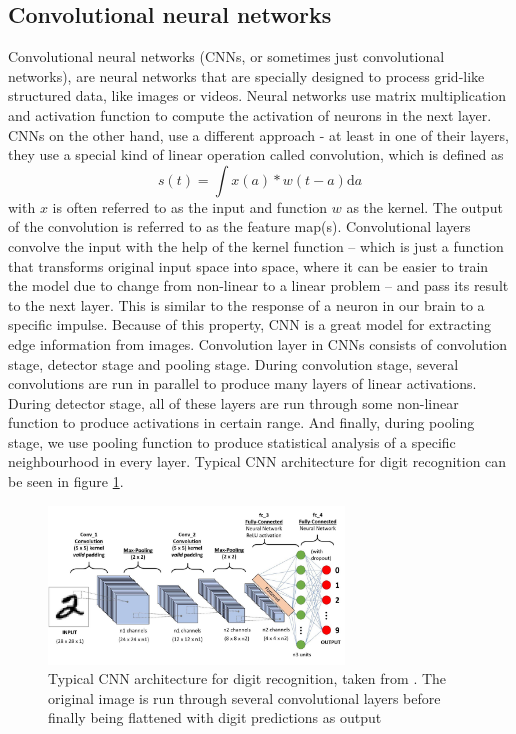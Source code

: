     \subsection{Convolutional neural networks}
    Convolutional neural networks (CNNs, or sometimes just convolutional networks), are neural networks that are specially designed to process grid-like structured data, like images or videos.
    \newline
    Neural networks use matrix multiplication and activation function to compute the activation of neurons in the next layer. CNNs on the other hand, use a different approach - at least in one of their layers, they use a special kind of linear operation called convolution, which is defined as 
    $$ s(t) = \int x(a) * w(t - a) \mathrm{d}a $$
    with $x$ is often referred to as the input and function $w$ as the kernel. The output of the convolution is referred to as the feature map(s). Convolutional layers convolve the input with the help of the kernel function -- which is just a function that transforms original input space into space, where it can be easier to train the model due to change from non-linear to a linear problem -- and pass its result to the next layer. This is similar to the response of a neuron in our brain to a specific impulse. Because of this property, CNN is a great model for extracting edge information from images. Convolution layer in CNNs consists of convolution stage, detector stage and pooling stage. During convolution stage, several convolutions are run in parallel to produce many layers of linear activations. During detector stage, all of these layers are run through some non-linear function to produce activations in certain range. And finally, during pooling stage, we use pooling function to produce statistical analysis of a specific neighbourhood in every layer. Typical CNN architecture for digit recognition can be seen in figure \ref{fig:cnn}.
    \begin{figure}
        \centerline{\includegraphics[width=0.7\textwidth]{praca/images/cnn_architecture.jpeg}}
        \caption[Typical CNN architecture for digit recognition]{Typical CNN architecture for digit recognition, taken from \cite{cnn}. The original image is run through several convolutional layers before finally being flattened with digit predictions as output}
        \label{fig:cnn}
    \end{figure}

